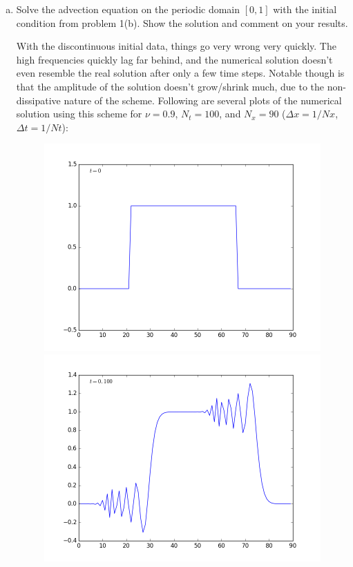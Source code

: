 \documentclass[12pt]{article}
\begin{document}
\begin{enumerate}[(a)]
\item Solve the advection equation on the periodic domain $[0,1]$ with the initial condition from problem 1(b).  Show the solution and comment on your results.

With the discontinuous initial data, things go very wrong very quickly.  The high frequencies quickly lag far behind, and the numerical solution doesn't even resemble the real solution after only a few time steps.  Notable though is that the amplitude of the solution doesn't grow/shrink much, due to the non-dissipative nature of the scheme.  Following are several plots of the numerical solution using this scheme for $\nu=0.9$, $N_t=100$, and $N_x=90$ ($\Delta x = 1/Nx$, $\Delta t=1/Nt$):

\noindent\begin{figure}[H]
\includegraphics[scale=0.45]{CN_advection_frames/CN_advection_fig01.png}
\includegraphics[scale=0.45]{CN_advection_frames/CN_advection_fig03.png}

\end{figure}
\end{enumerate}
\end{document}
